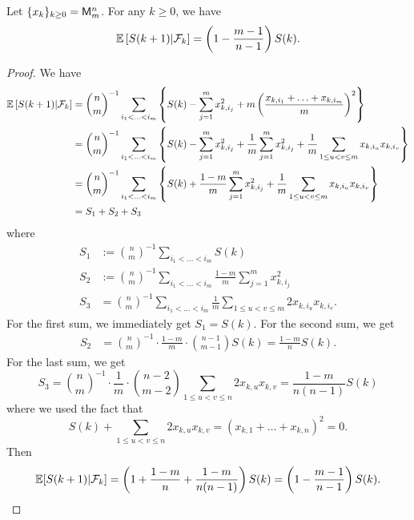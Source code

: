 \documentclass[12pt]{article}
\begin{document}
\begin{prop}
	Let $\{x_k\}_{k \geq 0} = \mathsf{M}_m^n$. For any $k \geq 0$, we have 
	\[
		\mathbb{E} \left [ S(k+1) | \mathcal{F}_k \right ] = \left ( 1 - \frac{m-1}{n-1} \right ) S(k).	
	\]
\end{prop}

\begin{proof}
	We have 
	\begin{align*}
		\mathbb{E} \left [ S(k+1) | \mathcal{F}_k \right ] & = \binom{n}{m}^{-1} \sum_{i_1 < \ldots < i_m} \left \{ S(k) - \sum_{j = 1}^m x_{k, i_j}^2 + m \left ( \frac{x_{k, i_1} + \ldots + x_{k, i_m}}{m} \right )^2 \right \} \\
		& = \binom{n}{m}^{-1} \sum_{i_1 < \ldots < i_m} \left \{ S(k) - \sum_{j = 1}^m x_{k, i_j}^2  + \frac{1}{m} \sum_{j = 1}^m x_{k, i_j}^2 + \frac{1}{m} \sum_{1 \leq u < v \leq m} x_{k, i_u} x_{k, i_v} \right \} \\
		& = \binom{n}{m}^{-1} \sum_{i_1 < \ldots < i_m} \left \{ S(k) + \frac{1-m}{m} \sum_{j = 1}^m x_{k, i_j}^2 + \frac{1}{m} \sum_{1 \leq u < v \leq m} x_{k, i_u} x_{k, i_v} \right \} \\
		& = S_1 + S_2 + S_3
	\end{align*}
	where 
	\begin{align*}
		S_1 & := \binom{n}{m}^{-1} \sum_{i_1 < \ldots < i_m} S(k) \\
		S_2 & := \binom{n}{m}^{-1} \sum_{i_1 < \ldots < i_m} \frac{1-m}{m} \sum_{j = 1}^m x_{k, i_j}^2 \\
		S_3 & = \binom{n}{m}^{-1} \sum_{i_1 < \ldots < i_m} \frac{1}{m} \sum_{1 \leq u < v \leq m} 2x_{k, i_u} x_{k, i_v}.
	\end{align*}
	For the first sum, we immediately get $S_1 = S(k)$. For the second sum, we get 
	\begin{align*}
		S_2 & = \binom{n}{m}^{-1} \cdot \frac{1-m}{m} \cdot \binom{n-1}{m-1} S(k) = \frac{1-m}{n} S(k). 
	\end{align*}
	For the last sum, we get 
	\[
		S_3 = \binom{n}{m}^{-1} \cdot \frac{1}{m} \cdot \binom{n-2}{m-2} \sum_{1 \leq u < v \leq n} 2x_{k, u} x_{k, v} = \frac{1-m}{n(n-1)} S(k)
	\]
	where we used the fact that 
	\[
		S(k) + \sum_{1 \leq u < v \leq n} 2x_{k, u} x_{k, v} = (x_{k, 1} + \ldots + x_{k, n})^2 = 0.	
	\]
	Then 
	\[
		\mathbb{E} [S(k+1) | \mathcal{F}_k] = \left ( 1 + \frac{1-m}{n} + \frac{1-m}{n(n-1)} \right ) S(k) = \left ( 1 - \frac{m-1}{n-1} \right ) S(k).	
	\]
\end{proof}
\end{document}
